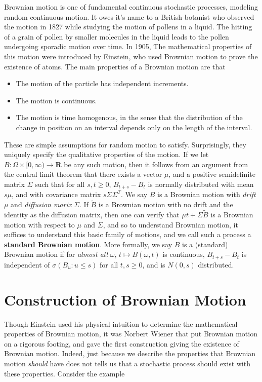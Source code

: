 Brownian motion is one of fundamental continuous stochastic processes, modeling random continuous motion. It owes it's name to a British botanist who observed the motion in 1827 while studying the motion of pollens in a liquid. The hitting of a grain of pollen by smaller molecules in the liquid leads to the pollen undergoing sporadic motion over time. In 1905, The mathematical properties of this motion were introduced by Einstein, who used Brownian motion to prove the existence of atoms. The main properties of a Brownian motion are that
%
\begin{itemize}
    \item The motion of the particle has independent increments.
    \item The motion is continuous.
    \item The motion is time homogenous, in the sense that the distribution of the change in position on an interval depends only on the length of the interval.
\end{itemize}
%
These are simple assumptions for random motion to satisfy. Surprisingly, they uniquely specify the qualitative properties of the motion. If we let $B: \Omega \times [0,\infty) \to \mathbf{R}$ be any such motion, then it follows from an argument from the central limit theorem that there exists a vector $\mu$, and a positive semidefinite matrix $\Sigma$ such that for all $s,t \geq 0$, $B_{t + s} - B_t$ is normally distributed with mean $s \mu$, and with covariance matrix $s \Sigma \Sigma^T$. We say $B$ is a Brownian motion with {\it drift} $\mu$ and {\it diffusion marix} $\Sigma$. If $\tilde{B}$ is a Brownian motion with no drift and the identity as the diffusion matrix, then one can verify that $\mu t + \Sigma \tilde{B}$ is a Brownian motion with respect to $\mu$ and $\Sigma$, and so to understand Brownian motion, it suffices to understand this basic family of motions, and we call such a process a {\bf standard Brownian motion}. More formally, we say $B$ is a (standard) Brownian motion if for {\it almost all} $\omega$, $t \mapsto B(\omega,t)$ is continuous, $B_{t+s} - B_t$ is independent of $\sigma(B_u: u \leq s)$ for all $t,s \geq 0$, and is $N(0,s)$ distributed.

\section{Construction of Brownian Motion}

Though Einstein used his physical intuition to determine the mathematical properties of Brownian motion, it was Norbert Wiener that put Brownian motion on a rigorous footing, and gave the first construction giving the existence of Brownian motion. Indeed, just because we describe the properties that Brownian motion {\it should} have does not tells us that a stochastic process should exist with these properties. Consider the example 


